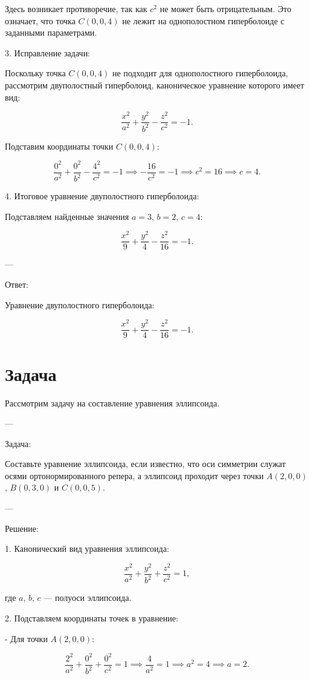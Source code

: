 \documentclass[a4paper,14pt]{extreport} %
\begin{document}
     Здесь возникает противоречие, так как \( c^2 \) не может быть отрицательным. Это означает, что точка \( C(0, 0, 4) \) не лежит на однополостном гиперболоиде с заданными параметрами.

3.  Исправление задачи: 

   Поскольку точка \( C(0, 0, 4) \) не подходит для однополостного гиперболоида, рассмотрим двуполостный гиперболоид, каноническое уравнение которого имеет вид:

   \[
   \frac{x^2}{a^2} + \frac{y^2}{b^2} - \frac{z^2}{c^2} = -1.
   \]

   Подставим координаты точки \( C(0, 0, 4) \):

   \[
   \frac{0^2}{a^2} + \frac{0^2}{b^2} - \frac{4^2}{c^2} = -1 \implies -\frac{16}{c^2} = -1 \implies c^2 = 16 \implies c = 4.
   \]

4.  Итоговое уравнение двуполостного гиперболоида: 

   Подставляем найденные значения \( a = 3 \), \( b = 2 \), \( c = 4 \):

   \[
   \frac{x^2}{9} + \frac{y^2}{4} - \frac{z^2}{16} = -1.
   \]

---

 Ответ: 

Уравнение двуполостного гиперболоида:

\[
\frac{x^2}{9} + \frac{y^2}{4} - \frac{z^2}{16} = -1.
\]
\section*{Задача}
Рассмотрим задачу на составление уравнения эллипсоида.

---

 Задача: 

Составьте уравнение эллипсоида, если известно, что оси симметрии служат осями ортонормированного репера, а эллипсоид проходит через точки \( A(2, 0, 0) \), \( B(0, 3, 0) \) и \( C(0, 0, 5) \).

---

 Решение: 

1.  Канонический вид уравнения эллипсоида: 

   \[
   \frac{x^2}{a^2} + \frac{y^2}{b^2} + \frac{z^2}{c^2} = 1,
   \]

   где \( a \), \( b \), \( c \) — полуоси эллипсоида.

2.  Подставляем координаты точек в уравнение: 

   - Для точки \( A(2, 0, 0) \):

     \[
     \frac{2^2}{a^2} + \frac{0^2}{b^2} + \frac{0^2}{c^2} = 1 \implies \frac{4}{a^2} = 1 \implies a^2 = 4 \implies a = 2.
     \]
\end{document}
